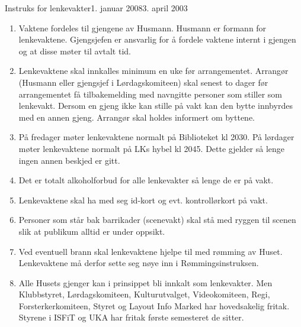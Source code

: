 \begin{instruks}{Instruks for lenkevakter}{1. januar 2008}{3. april 2003}

    \begin{enumerate}
        \item Vaktene fordeles til gjengene av Husmann. Husmann er formann for
            lenkevaktene. Gjengsjefen er ansvarlig
            for å fordele vaktene internt i gjengen og at disse møter til avtalt tid.
        \item Lenkevaktene skal innkalles minimum en uke før arrangementet. Arrangør
            (Husmann eller gjengsjef i
            Lørdagskomiteen) skal senest to dager før arrangementet få tilbakemelding med
            navngitte personer som
            stiller som lenkevakt. Dersom en gjeng ikke kan stille på vakt kan den bytte
            innbyrdes med en annen gjeng.
            Arrangør skal holdes informert om byttene.
        \item På fredager møter lenkevaktene normalt på Biblioteket kl 2030. På lørdager
            møter lenkevaktene normalt på
            LKs hybel kl 2045. Dette gjelder så lenge ingen annen beskjed er gitt.
        \item Det er totalt alkoholforbud for alle lenkevakter så lenge de er på vakt.
        \item Lenkevaktene skal ha med seg id-kort og evt. kontrollørkort på vakt.
        \item Personer som står bak barrikader (scenevakt) skal stå med ryggen til scenen
            slik at publikum alltid er under oppsikt.
        \item Ved eventuell brann skal lenkevaktene hjelpe til med rømming av Huset.
            Lenkevaktene må derfor sette seg nøye inn i Rømmingsinstruksen.
        \item Alle Husets gjenger kan i prinsippet bli innkalt som lenkevakter. Men
            Klubbstyret, Lørdagskomiteen, Kulturutvalget, Videokomiteen, Regi, Forsterkerkomiteen, Styret og Layout Info
            Marked har hovedsakelig fritak. Styrene i ISFiT og UKA har fritak første semesteret de sitter.
    \end{enumerate}
\end{instruks}




